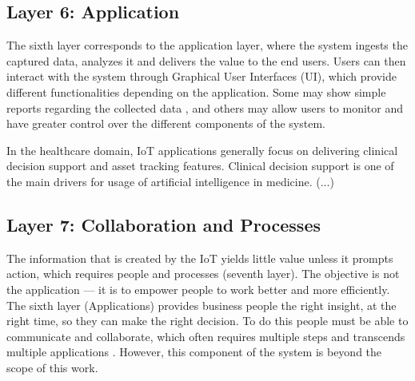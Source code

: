
\subsection{Layer 6: Application}
\label{sec:iot-model-layer6}


The sixth layer corresponds to the application layer, where the system ingests the captured data, analyzes it and delivers the value to the end users. Users can then interact with the system through Graphical User Interfaces (UI), which provide different functionalities depending on the application. Some may show simple reports regarding the collected data \cite{Doukas2012, Wu2020}, and others may allow users to monitor and have greater control over the different components of the system. \bigskip

In the healthcare domain, \acs{IoT} applications generally focus on delivering clinical decision support \cite{Gruendner2019,Wagholikar2017,Fan2014, BrainAnswer} and asset tracking \cite{Adame2018, Fuhrer2006, Catarinucci2015} features. Clinical decision support is one of the main drivers for usage of artificial intelligence in medicine\cite{Choi2016}. (...) 

\subsection{Layer 7: Collaboration and Processes}
\label{sec:iot-model-layer7}



The information that is created by the \acs{IoT} yields little value unless it prompts action, which requires people and processes (seventh layer). The objective is not the application — it is to empower people to work better and more efficiently. The sixth layer (Applications) provides business people the right insight, at the right time, so they can make the right decision. To do this people must be able to communicate and collaborate, which often requires multiple steps and transcends multiple applications \cite{Cisco2014}. However, this component of the system is beyond the scope of this work.

